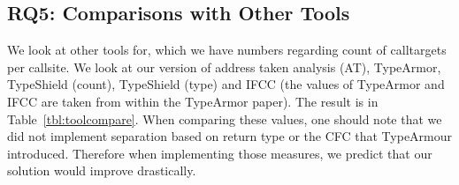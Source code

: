 \subsection{RQ5: Comparisons with Other Tools}
\label{RQ5: Is TypeShield better than other tools?}
\begin{table}[h!]
	\caption {The medians of calltargets per callsite for different tools that we have values for}
	\label{tbl:toolcompare}
\end{table}

We look at other tools for, which we have numbers regarding count of calltargets per callsite. 
We look at our version of address taken analysis (AT), TypeArmor, TypeShield (count), TypeShield (type) and 
IFCC (the values of TypeArmor and IFCC are taken from within the TypeArmor paper).
The result is in Table~\ref{tbl:toolcompare}. 
When comparing these values, one should note that we did not implement separation based on return type or the 
CFC that TypeArmour introduced. Therefore when implementing those measures, we predict that our solution 
would improve drastically.



